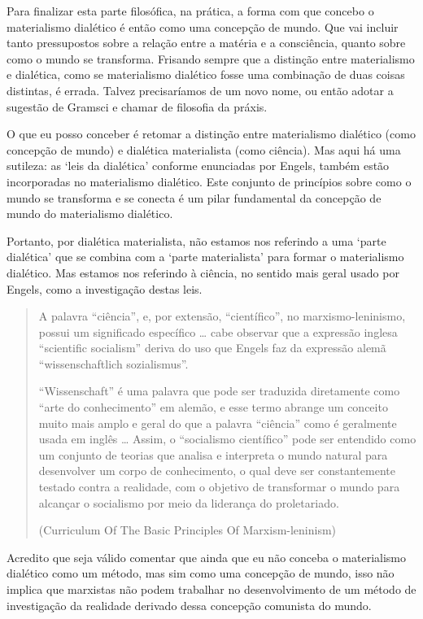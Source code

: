 Para finalizar esta parte filosófica, na prática, a forma com que concebo o materialismo dialético é então como uma concepção de mundo. Que vai incluir tanto pressupostos sobre a relação entre a matéria e a consciência, quanto sobre como o mundo se transforma. Frisando sempre que a distinção entre materialismo e dialética, como se materialismo dialético fosse uma combinação de duas coisas distintas, é errada. Talvez precisaríamos de um novo nome, ou então adotar a sugestão de Gramsci e chamar de filosofia da práxis.

O que eu posso conceber é retomar a distinção entre materialismo dialético (como concepção de mundo) e dialética materialista (como ciência). Mas aqui há uma sutileza: as ‘leis da dialética’ conforme enunciadas por Engels, também estão incorporadas no materialismo dialético. Este conjunto de princípios sobre como o mundo se transforma e se conecta é um pilar fundamental da concepção de mundo do materialismo dialético. 

Portanto, por dialética materialista, não estamos nos referindo a uma ‘parte dialética’ que se combina com a ‘parte materialista’ para formar o materialismo dialético. Mas estamos nos referindo à ciência, no sentido mais geral usado por Engels, como a investigação destas leis.

\begin{quote}
A palavra “ciência”, e, por extensão, “científico”, no marxismo-leninismo, possui um significado específico … cabe observar que a expressão inglesa “scientific socialism” deriva do uso que Engels faz da expressão alemã “wissenschaftlich sozialismus”.

“Wissenschaft” é uma palavra que pode ser traduzida diretamente como “arte do conhecimento” em alemão, e esse termo abrange um conceito muito mais amplo e geral do que a palavra “ciência” como é geralmente usada em inglês … Assim, o “socialismo científico” pode ser entendido como um conjunto de teorias que analisa e interpreta o mundo natural para desenvolver um corpo de conhecimento, o qual deve ser constantemente testado contra a realidade, com o objetivo de transformar o mundo para alcançar o socialismo por meio da liderança do proletariado.

(Curriculum Of The Basic Principles Of Marxism-leninism)
\end{quote}

Acredito que seja válido comentar que ainda que eu não conceba o materialismo dialético como um método, mas sim como uma concepção de mundo, isso não implica que marxistas não podem trabalhar no desenvolvimento de um método de investigação da realidade derivado dessa concepção comunista do mundo. 


